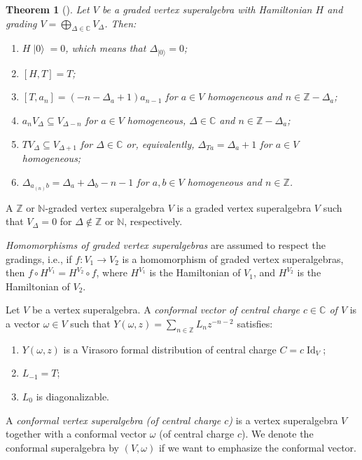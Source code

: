 \documentclass[a4paper, 12pt, reqno]{amsart}
\newtheorem{theorem}{Theorem}[section]
\theoremstyle{remark}
\DeclareMathOperator{\Id}{Id}
\DeclareMathOperator{\vac}{|0\rangle}
\begin{document}
\begin{theorem}[{\cite[\S4.9]{kac_vertex_1998}}]
  \label{thr:20}
  Let $V$ be a graded vertex superalgebra with Hamiltonian $H$ and grading $V = \bigoplus_{\Delta \in \mathbb{C}}V_{\Delta}$.
  Then:
  \begin{enumerate}
  \item $H\vac = 0$, which means that $\Delta_{\vac} = 0$;
  \item $[H, T] = T$;
  \item $[T, a_n] = (-n - \Delta_a + 1)a_{n - 1}$ for $a \in V$ homogeneous and $n \in \mathbb{Z} - \Delta_a$;
  \item $a_nV_{\Delta} \subseteq V_{\Delta - n}$ for $a \in V$ homogeneous, $\Delta \in \mathbb{C}$ and $n \in \mathbb{Z} - \Delta_a$;
  \item $TV_{\Delta} \subseteq V_{\Delta + 1}$ for $\Delta \in \mathbb{C}$ or, equivalently, $\Delta_{Ta} = \Delta_a + 1$ for $a \in V$ homogeneous;
  \item $\Delta_{a_{(n)}b} = \Delta_a + \Delta_b - n - 1$ for $a, b \in V$ homogeneous and $n \in \mathbb{Z}$.
  \end{enumerate}
\end{theorem}

A $\mathbb{Z}$ or $\mathbb{N}$-graded vertex superalgebra $V$ is a graded vertex superalgebra $V$ such that $V_{\Delta} = 0$ for $\Delta \notin \mathbb{Z}$ or $\mathbb{N}$, respectively.

\emph{Homomorphisms of graded vertex superalgebras} are assumed to respect the gradings, i.e., if $f: V_1 \to V_2$ is a homomorphism of graded vertex superalgebras, then $f\circ H^{V_1} = H^{V_2}\circ f$, where $H^{V_1}$ is the Hamiltonian of $V_1$, and $H^{V_2}$ is the Hamiltonian of $V_2$.

Let $V$ be a vertex superalgebra.
A \emph{conformal vector of central charge $c \in \mathbb{C}$ of $V$} is a vector $\omega \in V$ such that $Y(\omega, z) = \sum_{n \in \mathbb{Z}}L_nz^{-n - 2}$ satisfies:
\begin{enumerate}
\item $Y(\omega, z)$ is a Virasoro formal distribution of central charge $C = c\Id_V$;
\item $L_{-1} = T$;
\item $L_0$ is diagonalizable.
\end{enumerate}

A \emph{conformal vertex superalgebra (of central charge $c$)} is a vertex superalgebra $V$ together with a conformal vector $\omega$ (of central charge $c$).
We denote the conformal superalgebra by $(V, \omega)$ if we want to emphasize the conformal vector.
\end{document}
